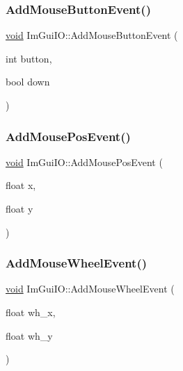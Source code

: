 \mbox{\label{structImGuiIO_a9fa5df74047424bb03d7cb29c6fb6ea1}} 
\subsubsection{\texorpdfstring{Add\+Mouse\+Button\+Event()}{AddMouseButtonEvent()}}
{\footnotesize\ttfamily \hyperlink{imgui__impl__opengl3__loader_8h_ac668e7cffd9e2e9cfee428b9b2f34fa7}{void} Im\+Gui\+I\+O\+::\+Add\+Mouse\+Button\+Event (\begin{DoxyParamCaption}\item[{int}]{button,  }\item[{bool}]{down }\end{DoxyParamCaption})}

\mbox{\label{structImGuiIO_ab6423058bbb3503c3cf66e0e45ee606d}} 
\subsubsection{\texorpdfstring{Add\+Mouse\+Pos\+Event()}{AddMousePosEvent()}}
{\footnotesize\ttfamily \hyperlink{imgui__impl__opengl3__loader_8h_ac668e7cffd9e2e9cfee428b9b2f34fa7}{void} Im\+Gui\+I\+O\+::\+Add\+Mouse\+Pos\+Event (\begin{DoxyParamCaption}\item[{float}]{x,  }\item[{float}]{y }\end{DoxyParamCaption})}

\mbox{\label{structImGuiIO_ad3b1a263e8a6e346dd1bef89ce3fb946}} 
\subsubsection{\texorpdfstring{Add\+Mouse\+Wheel\+Event()}{AddMouseWheelEvent()}}
{\footnotesize\ttfamily \hyperlink{imgui__impl__opengl3__loader_8h_ac668e7cffd9e2e9cfee428b9b2f34fa7}{void} Im\+Gui\+I\+O\+::\+Add\+Mouse\+Wheel\+Event (\begin{DoxyParamCaption}\item[{float}]{wh\+\_\+x,  }\item[{float}]{wh\+\_\+y }\end{DoxyParamCaption})}

